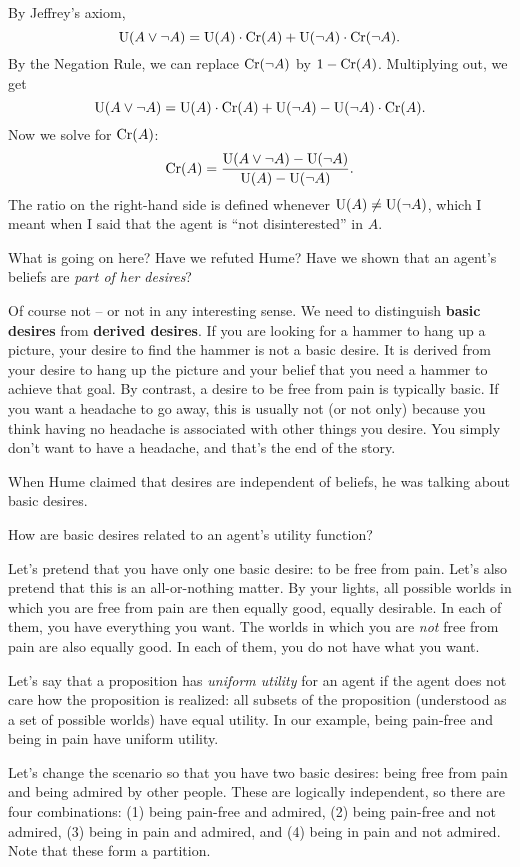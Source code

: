 By Jeffrey's axiom,
\[
  \text{U}(A \lor \neg A) = \text{U}(A)\cdot \text{Cr}(A) + \text{U}(\neg A)\cdot \text{Cr}(\neg A).
\]
By the Negation Rule, we can replace $\text{Cr}(\neg A)$ by $1 - \text{Cr}(A)$.
Multiplying out, we get
\[
  \text{U}(A \lor \neg A) = \text{U}(A)\cdot \text{Cr}(A) + \text{U}(\neg A) - \text{U}(\neg A)\cdot \text{Cr}(A).
\]
Now we solve for $\text{Cr}(A)$:
\[
  \text{Cr}(A) = \frac{\text{U}(A \lor \neg A) - \text{U}(\neg A)}{\text{U}(A) - \text{U}(\neg A)}.
\]
The ratio on the right-hand side is defined whenever $\text{U}(A) \not= \text{U}(\neg A)$, which I meant when I said that the agent is ``not disinterested'' in $A$.

What is going on here? Have we refuted Hume? Have we shown that an
agent's beliefs are \emph{part of her desires}? 

Of course not -- or not in any interesting sense. We need to distinguish
\textbf{basic desires} from \textbf{derived desires}. If you are looking for a
hammer to hang up a picture, your desire to find the hammer is not a basic
desire. It is derived from your desire to hang up the picture and your
belief that you need a hammer to achieve that goal. By contrast, a desire to be
free from pain is typically basic. If you want a headache to go away, this is
usually not (or not only) because you think having no headache is associated
with other things you desire. You simply don't want to have a headache, and
that's the end of the story.

When Hume claimed that desires are independent of beliefs, he was
talking about basic desires.

How are basic desires related to an agent's utility function?

Let's pretend that you have only one basic desire: to be free from pain. Let's
also pretend that this is an all-or-nothing matter. By your lights, all possible
worlds in which you are free from pain are then equally good, equally desirable.
In each of them, you have everything you want. The worlds in which you are
\emph{not} free from pain are also equally good. In each of them, you do not
have what you want.

Let's say that a proposition has \emph{uniform utility} for an agent if the
agent does not care how the proposition is realized: all subsets of the
proposition (understood as a set of possible worlds) have equal utility. In our
example, being pain-free and being in pain have uniform utility.

Let's change the scenario so that you have two basic desires: being free from
pain and being admired by other people. These are logically independent, so
there are four combinations: (1) being pain-free and admired, (2) being
pain-free and not admired, (3) being in pain and admired, and (4) being in pain
and not admired. Note that these form a partition.

